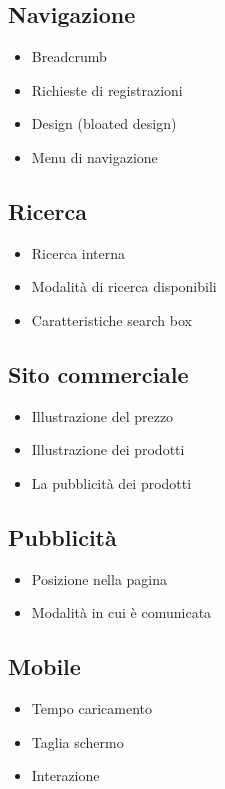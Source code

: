 			\subsection*{Navigazione}
				\begin{itemize}
					\item Breadcrumb
					\item Richieste di registrazioni
					\item Design (bloated design)
					\item Menu di navigazione
				\end{itemize}
			
			\subsection*{Ricerca}
				\begin{itemize}
					\item Ricerca interna
					\item Modalità di ricerca disponibili
					\item Caratteristiche search box
				\end{itemize}
			
			\subsection*{Sito commerciale}
				\begin{itemize}
					\item Illustrazione del prezzo
					\item Illustrazione dei prodotti
					\item La pubblicità dei prodotti
				\end{itemize}
			
			\subsection*{Pubblicità}
				\begin{itemize}
					\item Posizione nella pagina
					\item Modalità in cui è comunicata
				\end{itemize}
			
			\subsection*{Mobile}
				\begin{itemize}
					\item Tempo caricamento
					\item Taglia schermo
					\item Interazione
				\end{itemize}
				

